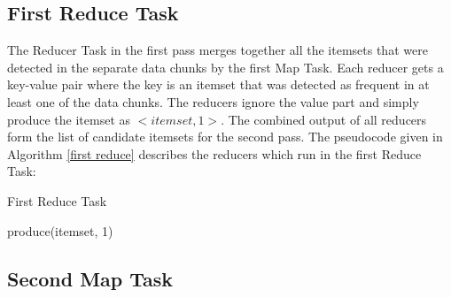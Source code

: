 \subsection{First Reduce Task}
The Reducer Task in the first pass merges together all the itemsets that were detected in the separate data chunks by the first Map Task. Each reducer gets a key-value pair where the key is an itemset that was detected as frequent in at least one of the data chunks. The reducers ignore the value part and simply produce the itemset as $<itemset, 1>$. The combined output of all reducers form the list of candidate itemsets for the second pass. The pseudocode given in Algorithm \ref{first reduce} describes the reducers which run in the first Reduce Task:
\begin{algorithm}
  \caption{First Reduce Task}\label{first reduce}
  \begin{algorithmic}[1]
      \State produce(itemset, 1)
    \EndFunction
\end{algorithmic}
\end{algorithm}
\subsection{Second Map Task}\label{second map task}


